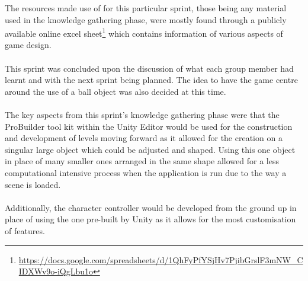 \noindent The resources made use of for this particular sprint, those being any material used in the knowledge gathering phase, were mostly found through a publicly available online excel sheet\footnote{\url{https://docs.google.com/spreadsheets/d/1QhFyPfYSjHv7PjibGrslF3mNW_CIDXWv9o-iQgLbu1o}} which contains information of various aspects of game design.
\\\\
This sprint was concluded upon the discussion of what each group member had learnt and with the next sprint being planned. The idea to have the game centre around the use of a ball object was also decided at this time.
\\\\
The key aspects from this sprint's knowledge gathering phase were that the ProBuilder tool kit within the Unity Editor would be used for the construction and development of levels moving forward as it allowed for the creation on a singular large object which could be adjusted and shaped. Using this one object in place of many smaller ones arranged in the same shape allowed for a less computational intensive process when the application is run due to the way a scene is loaded. 
\\\\
Additionally, the character controller would be developed from the ground up in place of using the one pre-built by Unity as it allows for the most customisation of features. 

